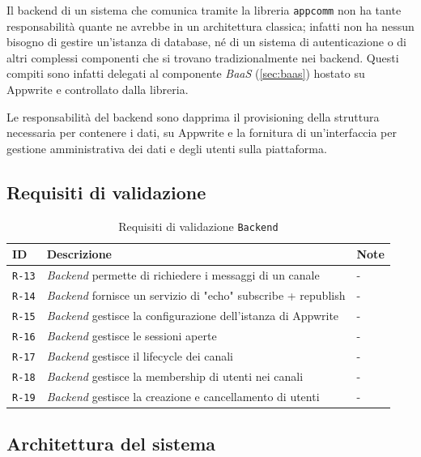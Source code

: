 \documentclass[a4paper, 11pt, twoside]{report}
\begin{document}
Il backend di un sistema che comunica tramite la libreria \texttt{appcomm} non ha tante responsabilità quante ne avrebbe in un
architettura classica; infatti non ha nessun bisogno di gestire un'istanza di database, né di un sistema di autenticazione o di
altri complessi componenti che si trovano tradizionalmente nei backend.
Questi compiti sono infatti delegati al componente \textit{BaaS} (\ref{sec:baas}) hostato su Appwrite e controllato
dalla libreria.

Le responsabilità del backend sono dapprima il provisioning della struttura necessaria per contenere i dati, su Appwrite e la
fornitura di un'interfaccia per gestione amministrativa dei dati e degli utenti sulla piattaforma.

\subsection{Requisiti di validazione}

\begin{table}[h]
\centering
\begin{tabular}{@{}lp{12cm}l@{}}
\toprule
\textbf{ID}   & \textbf{Descrizione}                                                  & \textbf{Note}\\ \midrule
\texttt{R-13} & \textit{Backend} permette di richiedere i messaggi di un canale       & - \\
\texttt{R-14} & \textit{Backend} fornisce un servizio di "echo" subscribe + republish & - \\
\texttt{R-15} & \textit{Backend} gestisce la configurazione dell'istanza di Appwrite  & - \\
\texttt{R-16} & \textit{Backend} gestisce le sessioni aperte                          & - \\
\texttt{R-17} & \textit{Backend} gestisce il lifecycle dei canali                     & - \\
\texttt{R-18} & \textit{Backend} gestisce la membership di utenti nei canali          & - \\
\texttt{R-19} & \textit{Backend} gestisce la creazione e cancellamento di utenti      & - \\
\bottomrule
\end{tabular}
\caption{Requisiti di validazione \texttt{Backend}}
\end{table}

\subsection{Architettura del sistema}
\end{document}
